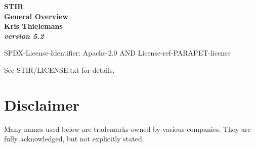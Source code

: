 \documentclass{article}
\begin{document}
\begin{center}

\begin{spacing}{1.5}
\textbf{{\huge STIR \\
General Overview}}\\
\textbf{Kris Thielemans}\\
\textbf{\textit{version 5.2}}


\end{spacing}

SPDX-License-Identifier: Apache-2.0 AND License-ref-PARAPET-license

See STIR/LICENSE.txt for details.

\end{center}

\tableofcontents 


\section{
Disclaimer}
Many names used below are trademarks owned by various companies. They are
fully acknowledged, but not explicitly stated.
\end{document}
